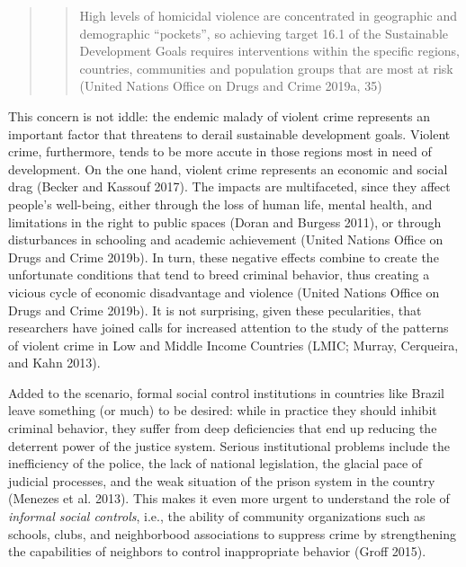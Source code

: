 \documentclass[smallextended]{svjour3}       %
\begin{document}
\begin{quote}
\begin{quote}
High levels of homicidal violence are concentrated in geographic and
demographic ``pockets'', so achieving target 16.1 of the Sustainable
Development Goals requires interventions within the specific regions,
countries, communities and population groups that are most at risk
(United Nations Office on Drugs and Crime 2019a, 35)
\end{quote}
\end{quote}

This concern is not iddle: the endemic malady of violent crime
represents an important factor that threatens to derail sustainable
development goals. Violent crime, furthermore, tends to be more accute
in those regions most in need of development. On the one hand, violent
crime represents an economic and social drag (Becker and Kassouf 2017).
The impacts are multifaceted, since they affect people's well-being,
either through the loss of human life, mental health, and limitations in
the right to public spaces (Doran and Burgess 2011), or through
disturbances in schooling and academic achievement (United Nations
Office on Drugs and Crime 2019b). In turn, these negative effects
combine to create the unfortunate conditions that tend to breed criminal
behavior, thus creating a vicious cycle of economic disadvantage and
violence (United Nations Office on Drugs and Crime 2019b). It is not
surprising, given these pecularities, that researchers have joined calls
for increased attention to the study of the patterns of violent crime in
Low and Middle Income Countries (LMIC; Murray, Cerqueira, and Kahn
2013).

Added to the scenario, formal social control institutions in countries
like Brazil leave something (or much) to be desired: while in practice
they should inhibit criminal behavior, they suffer from deep
deficiencies that end up reducing the deterrent power of the justice
system. Serious institutional problems include the inefficiency of the
police, the lack of national legislation, the glacial pace of judicial
processes, and the weak situation of the prison system in the country
(Menezes et al. 2013). This makes it even more urgent to understand the
role of \emph{informal social controls}, i.e., the ability of community
organizations such as schools, clubs, and neighborbood associations to
suppress crime by strengthening the capabilities of neighbors to control
inappropriate behavior (Groff 2015).
\end{document}
